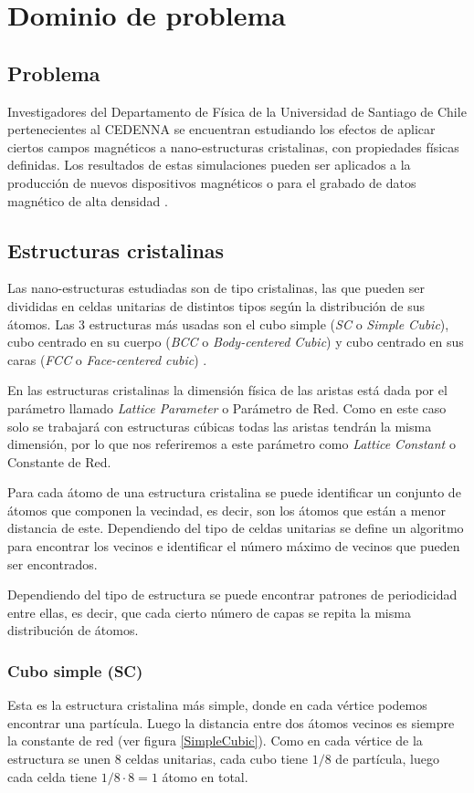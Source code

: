 \chapter{Dominio de problema}
\label{cap:dominio}

\section{Problema}
Investigadores del Departamento de Física de la Universidad de Santiago de Chile pertenecientes al CEDENNA se encuentran estudiando los efectos de aplicar ciertos campos magnéticos a nano-estructuras cristalinas, con propiedades físicas definidas. Los resultados de estas simulaciones pueden ser aplicados a la producción de nuevos dispositivos magnéticos o para el grabado de datos magnético de alta densidad  \citep{asymmetricMagneticDots}.

\section{Estructuras cristalinas}
Las nano-estructuras estudiadas son de tipo cristalinas, las que pueden ser divididas en celdas unitarias de distintos tipos  según la distribución de sus átomos. Las 3 estructuras más usadas son el cubo simple (\emph{SC} o \emph{Simple Cubic}), cubo centrado en su cuerpo (\emph{BCC} o \emph{Body-centered Cubic}) y cubo centrado en sus caras (\emph{FCC} o \emph{Face-centered cubic}) \citep{ITC213}.

En las estructuras cristalinas la dimensión física de las aristas está dada por el parámetro llamado \emph{Lattice Parameter} o Parámetro de Red. Como en este caso solo se trabajará con estructuras cúbicas todas las aristas tendrán la misma dimensión, por lo que nos referiremos a este parámetro como \emph{Lattice Constant} o Constante de Red.

Para cada átomo de una estructura cristalina se puede identificar un conjunto de átomos que componen la vecindad, es decir, son los átomos que están a menor distancia de este. Dependiendo del tipo de celdas unitarias se define un algoritmo para encontrar los vecinos e identificar el número máximo de vecinos que pueden ser encontrados.

Dependiendo del tipo de estructura se puede encontrar patrones de periodicidad entre ellas, es decir, que cada cierto número de capas se repita la misma distribución de átomos.

\subsection{Cubo simple (SC)}
Esta es la estructura cristalina más simple, donde en cada vértice podemos encontrar una partícula. Luego la distancia entre dos átomos vecinos es siempre la constante de red (ver figura \ref{SimpleCubic}). Como en cada vértice de la estructura se unen 8 celdas unitarias, cada cubo tiene $1/8$ de partícula, luego cada celda tiene $1/8 \cdot 8 = 1$ átomo en total.

